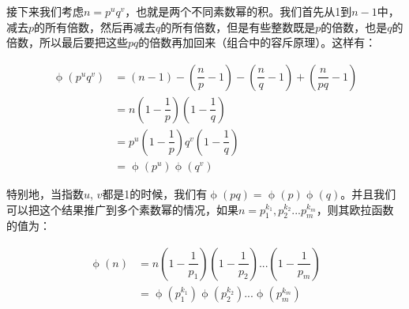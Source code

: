 接下来我们考虑$n = p^uq^v$，也就是两个不同素数幂的积。我们首先从1到$n-1$中，减去$p$的所有倍数，然后再减去$q$的所有倍数，但是有些整数既是$p$的倍数，也是$q$的倍数，所以最后要把这些$pq$的倍数再加回来（组合中的容斥原理）。这样有：

\begin{align*}
\upphi(p^uq^v) &=  (n - 1) - (\dfrac{n}{p} - 1) - (\dfrac{n}{q} - 1) + (\dfrac{n}{pq} - 1) \\
          &=  n(1 - \dfrac{1}{p})(1 - \dfrac{1}{q}) \\[5pt]
          &=  p^u(1 - \dfrac{1}{p})q^v(1 - \dfrac{1}{q}) \\[5pt]
          &=  \upphi(p^u)\upphi(q^v)
\end{align*}

特别地，当指数$u$, $v$都是1的时候，我们有$\upphi(pq) = \upphi(p)\upphi(q)$。并且我们可以把这个结果推广到多个素数幂的情况，如果$n = p_1^{k_1}, p_2^{k_2}...p_m^{k_m}$，则其欧拉函数的值为：

\begin{align*}
\upphi(n) &= n(1-\dfrac{1}{p_1})(1-\dfrac{1}{p_2})...(1-\dfrac{1}{p_m}) \\[5pt]
    &= \upphi(p_1^{k_1})\upphi(p_2^{k_2})...\upphi(p_m^{k_m})
\end{align*}
